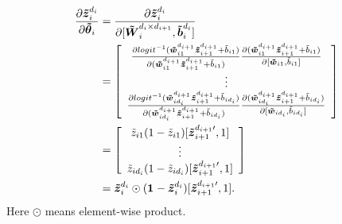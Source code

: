 \begin{equation*}
\begin{split}
  \PDV{\oDi}{\pDC_i} &= \PDV{\oDi}{[\WDi, \bDi]} \\
  &= \left[\begin{array}{c}
      \PDV{logit^{-1}(\wDC_{i1  }^{d_{i+1}} \zDC_{i+1}^{d_{i+1}} + \tilde{b}_{i1  })} {(\wDC_{i1  }^{d_{i+1}} \zDC_{i+1}^{d_{i+1}} + \tilde{b}_{i1  })}
      \PDV{(\wDC_{i1}^{d_{i+1}} \zDC_{i+1}^{d_{i+1}} + \tilde{b}_{i1})}{[\wDC_{i1}, \tilde{b}_{i1}]} \\
      \vdots \\
      \PDV{logit^{-1}(\wDC_{id_i}^{d_{i+1}} \zDC_{i+1}^{d_{i+1}} + \tilde{b}_{id_i})} {(\wDC_{id_i}^{d_{i+1}} \zDC_{i+1}^{d_{i+1}} + \tilde{b}_{id_i})}
      \PDV{(\wDC_{id_i}^{d_{i+1}} \zDC_{i+1}^{d_{i+1}} + \tilde{b}_{id_i})}{[\wDC_{id_i}, \tilde{b}_{id_i}]} \\
    \end{array} \right] \\
  &= \left[\begin{array}{c}
      \tilde{z}_{i1  }(1-\tilde{z}_{i1  }) [\zDC_{i+1}^{d_{i+1}\prime}, 1] \\
      \vdots \\
      \tilde{z}_{id_i}(1-\tilde{z}_{id_i}) [\zDC_{i+1}^{d_{i+1}\prime}, 1] \\
    \end{array} \right] \\
  &= \oDi \odot (\one{} - \oDi) [\zDC_{i+1}^{d_{i+1}\prime}, 1].
\end{split}
\end{equation*}
Here $\odot$ means element-wise product. 

